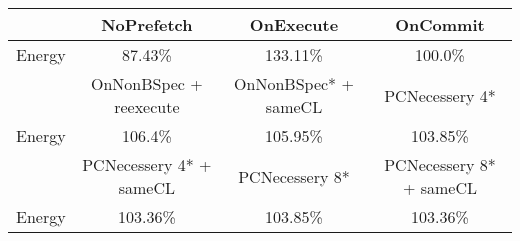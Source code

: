\begin{tabular}{ l|ccc }
 & NoPrefetch & OnExecute & OnCommit\\ \hline
Energy
 & 87.43\% & 133.11\% & 100.0\%\\ \hline
\hline
 & OnNonBSpec + reexecute & OnNonBSpec* + sameCL & PCNecessery 4*\\ \hline
Energy
 & 106.4\% & 105.95\% & 103.85\%\\ \hline
\hline
 & PCNecessery 4* + sameCL & PCNecessery 8* & PCNecessery 8* + sameCL\\ \hline
Energy
 & 103.36\% & 103.85\% & 103.36\%\\ \hline
\end{tabular}

